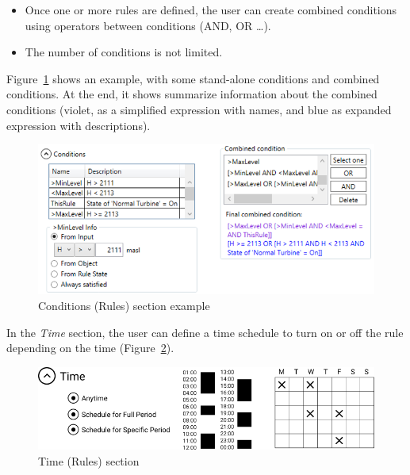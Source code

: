 \documentclass[
  letterpaper,
  DIV=11,
  numbers=noendperiod]{scrreprt}
\begin{document}
\begin{itemize}
\item
  {Once one or more rules are defined, the user can create combined
  conditions using operators between conditions (AND, OR \ldots).}
\item
  {The number of conditions is not limited.}
\end{itemize}

Figure~\ref{fig-planner_conditions_section_example} shows an example,
with some stand-alone conditions and combined conditions. At the end, it
shows summarize information about the combined conditions (violet, as a
simplified expression with names, and blue as expanded expression with
descriptions).

\begin{figure}

{\centering \includegraphics{./figures/fig-planner_conditions_section_example.png}

}

\caption{\label{fig-planner_conditions_section_example}Conditions
(Rules) section example}

\end{figure}

In the \emph{Time} section, the user can define a time schedule to turn
on or off the rule depending on the time
(Figure~\ref{fig-planner_time_rules_section}).

\begin{figure}

{\centering \includegraphics{./figures/fig-planner_time_rules_section.png}

}

\caption{\label{fig-planner_time_rules_section}Time (Rules) section}

\end{figure}
\end{document}
